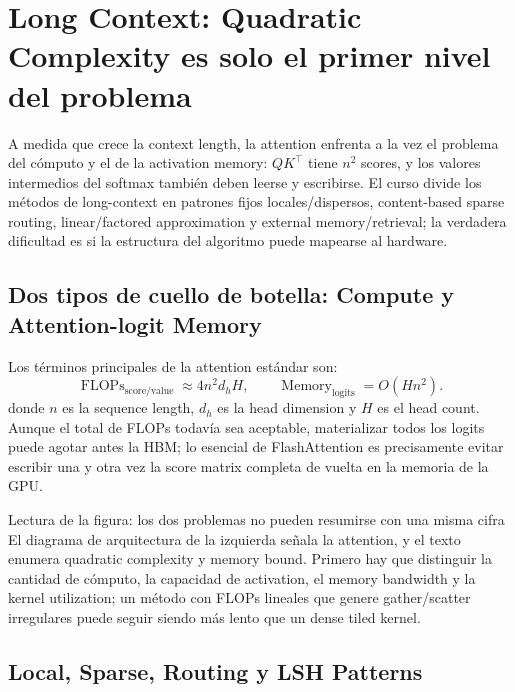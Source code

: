 \section{Long Context: Quadratic Complexity es solo el primer nivel del problema}

A medida que crece la context length, la attention enfrenta a la vez el problema del cómputo y el de la activation memory: $QK^\top$ tiene $n^2$ scores, y los valores intermedios del softmax también deben leerse y escribirse. El curso divide los métodos de long-context en patrones fijos locales/dispersos, content-based sparse routing, linear/factored approximation y external memory/retrieval; la verdadera dificultad es si la estructura del algoritmo puede mapearse al hardware.

\subsection{Dos tipos de cuello de botella: Compute y Attention-logit Memory}

Los términos principales de la attention estándar son:
\[
\operatorname{FLOPs}_{\mathrm{score/value}}\approx 4n^2d_hH,
\qquad \operatorname{Memory}_{\mathrm{logits}}=O(Hn^2).
\]
donde $n$ es la sequence length, $d_h$ es la head dimension y $H$ es el head count. Aunque el total de FLOPs todavía sea aceptable, materializar todos los logits puede agotar antes la HBM; lo esencial de FlashAttention es precisamente evitar escribir una y otra vez la score matrix completa de vuelta en la memoria de la GPU.


\begin{knowledgebox}{Lectura de la figura: los dos problemas no pueden resumirse con una misma cifra}
El diagrama de arquitectura de la izquierda señala la attention, y el texto enumera quadratic complexity y memory bound. Primero hay que distinguir la cantidad de cómputo, la capacidad de activation, el memory bandwidth y la kernel utilization; un método con FLOPs lineales que genere gather/scatter irregulares puede seguir siendo más lento que un dense tiled kernel.
\end{knowledgebox}

\subsection{Local, Sparse, Routing y LSH Patterns}

